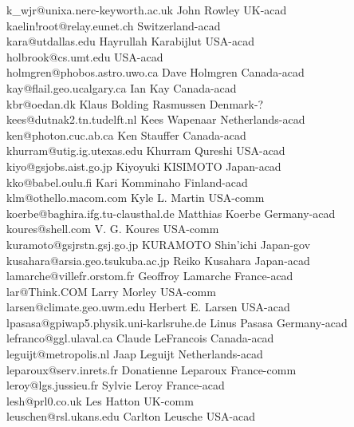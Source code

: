 \begin{tabbing}
k\_wjr@unixa.nerc-keyworth.ac.uk \> John Rowley \> UK-acad\\
kaelin!root@relay.eunet.ch \> \> Switzerland-acad\\
kara@utdallas.edu \> Hayrullah Karabijlut \>  USA-acad\\
holbrook@cs.umt.edu \> \> USA-acad\\
holmgren@phobos.astro.uwo.ca \> Dave Holmgren \> Canada-acad\\
kay@flail.geo.ucalgary.ca \> Ian Kay \> Canada-acad\\
kbr@oedan.dk \> Klaus Bolding Rasmussen \> Denmark-?\\
kees@dutnak2.tn.tudelft.nl \> Kees Wapenaar \> Netherlands-acad\\
ken@photon.cuc.ab.ca \> Ken Stauffer \> Canada-acad\\
khurram@utig.ig.utexas.edu \> Khurram Qureshi \> USA-acad\\
kiyo@gsjobs.aist.go.jp \> Kiyoyuki KISIMOTO \> Japan-acad\\
kko@babel.oulu.fi \> Kari Komminaho \>  Finland-acad\\
klm@othello.macom.com \>Kyle L. Martin \> USA-comm\\
koerbe@baghira.ifg.tu-clausthal.de \> Matthias Koerbe \> Germany-acad\\
koures@shell.com \> V. G. Koures \>  USA-comm\\
kuramoto@gsjrstn.gsj.go.jp \> KURAMOTO Shin'ichi \> Japan-gov\\
kusahara@arsia.geo.tsukuba.ac.jp \> Reiko Kusahara \> Japan-acad\\
lamarche@villefr.orstom.fr \> Geoffroy Lamarche \> France-acad\\
lar@Think.COM \> Larry Morley \> USA-comm\\
larsen@climate.geo.uwm.edu \> Herbert E. Larsen \> USA-acad\\
lpasasa@gpiwap5.physik.uni-karlsruhe.de \> Linus Pasasa \> Germany-acad\\
lefranco@ggl.ulaval.ca \> Claude LeFrancois \> Canada-acad\\
leguijt@metropolis.nl \> Jaap Leguijt \> Netherlands-acad\\
leparoux@serv.inrets.fr  \> Donatienne Leparoux \> France-comm\\
leroy@lgs.jussieu.fr \> Sylvie Leroy \> France-acad\\
lesh@prl0.co.uk \> Les Hatton \> UK-comm\\
leuschen@rsl.ukans.edu \> Carlton Leusche \> USA-acad\\

\end{tabbing}
